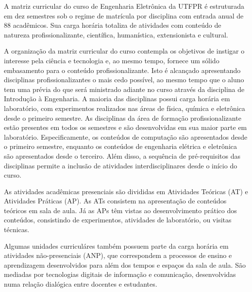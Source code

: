 A matriz curricular do curso de Engenharia Eletrônica da UTFPR é estruturada em dez semestres sob o regime de matrícula por disciplina com entrada anual de 88 acadêmicos. Sua carga horária totaliza  de atividades com conteúdo de natureza profissionalizante, científica, humanística, extensionista e cultural.

A organização da matriz curricular do curso contempla os objetivos de instigar o interesse pela ciência e tecnologia e, ao mesmo tempo, fornece um sólido embasamento para o conteúdo profissionalizante. Isto é alcançado apresentando disciplinas profissionalizantes o mais cedo possível, ao mesmo tempo que o aluno tem uma prévia do que será ministrado adiante no curso através da disciplina de Introdução à Engenharia. A maioria das disciplinas possui carga horária em laboratório, com experimentos realizados nas áreas de física, química e eletrônica desde o primeiro semestre. As disciplinas da área de formação profissionalizante estão presentes em todos os semestres e são desenvolvidas em sua maior parte em laboratório. Especificamente, os conteúdos de computação são apresentados desde o primeiro semestre, enquanto os conteúdos de engenharia elétrica e eletrônica são apresentados desde o terceiro. Além disso, a sequência de pré-requisitos das disciplinas permite a inclusão de atividades interdisciplinares desde o início do curso.

As atividades acadêmicas presenciais são divididas em Atividades Teóricas (AT) e Atividades Práticas (AP). As ATs consistem na apresentação de conteúdos teóricos em sala de aula. Já as APs têm vistas ao desenvolvimento prático dos conteúdos, consistindo de experimentos, atividades de laboratório, ou visitas técnicas. 

Algumas unidades curriculáres também possuem parte da carga horária  em atividades não-presenciais (ANP), que correspondem a processos de ensino e aprendizagem desenvolvidos para além dos tempos e espaços da sala de aula. São mediadas por tecnologias digitais de informação e comunicação, desenvolvidas numa relação dialógica entre docentes e estudantes.





